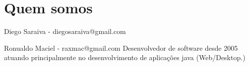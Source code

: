 \section{Quem somos}

\begin{frame}
	\begin{block}{Diego Saraiva - diegosaraiva@gmail.com}
		
		
	\end{block}
	
	\begin{block}{Ronualdo Maciel - raxmac@gmail.com}
			Desenvolvedor de software desde 2005 atuando principalmente no
			desenvolvimento de aplicações java (Web/Desktop.)
	\end{block}
\end{frame}